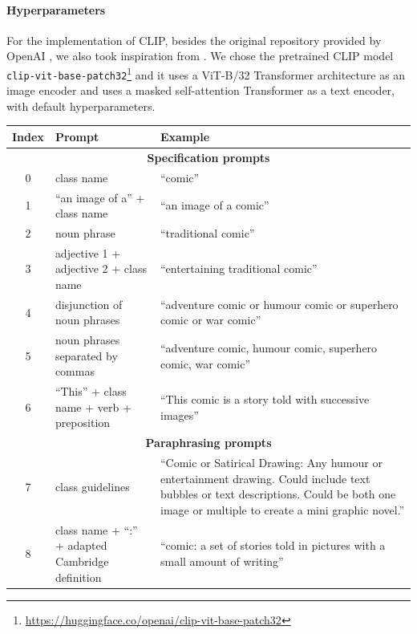 \paragraph{Hyperparameters} For the implementation of CLIP, besides the original repository provided by OpenAI \parencite{openai2022clip-repo}, we also took inspiration from \parencite{pinecone2022clip1,pinecone2022clip2}. We chose the pretrained CLIP model \texttt{clip-vit-base-patch32}\footnote{\url{https://huggingface.co/openai/clip-vit-base-patch32}} and it uses a ViT-B/32 Transformer architecture \parencite{dosovitskiy2020image} as an image encoder and uses a masked self-attention Transformer as a text encoder, with default hyperparameters.


\begin{table}[ht]
    \centering
    \begin{tabular}{c p{7cm} p{7cm}}
        \rowcolor{lightgreen} \textbf{Index} & \textbf{Prompt} & \textbf{Example} \\ \hline
        \multicolumn{3}{c}{\textbf{Specification prompts}} \\
        \rowcolor{lightgreen} 0 & class name & “comic”\\
        \rowcolor{lightgreen} 1 & “an image of a” + class name & “an image of a comic” \\
        \rowcolor{lightgreen} 2 & noun phrase & “traditional comic”\\
        \rowcolor{lightgreen} 3 & adjective 1 + adjective 2 + class name & “entertaining traditional comic” \\
        \rowcolor{lightgreen} 4 & disjunction of noun phrases & “adventure comic or humour comic or superhero comic or war comic” \\
        \rowcolor{lightgreen} 5 & noun phrases separated by commas & “adventure comic, humour comic, superhero comic, war comic” \\
        \rowcolor{lightgreen} 6 & “This” + class name + verb + preposition & “This comic is a story told with successive images” \\
        \multicolumn{3}{c}{\textbf{Paraphrasing prompts}} \\
        \rowcolor{lightgreen} 7 & class guidelines & “Comic or Satirical Drawing: Any humour or entertainment drawing. Could include text bubbles or text descriptions. Could be both one image or multiple to create a mini graphic novel.” \\
        \rowcolor{lightgreen} 8 & class name + “:” + adapted Cambridge definition & “comic: a set of stories told in pictures with a small amount of writing” \\

\end{tabular}
\end{table}
